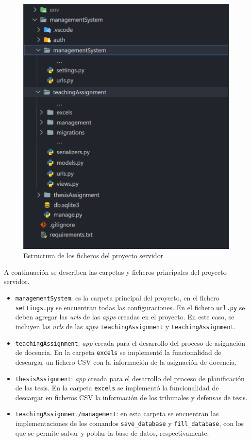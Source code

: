 \begin{figure}[H]
    \centering
    \includegraphics[scale=0.18]{Graphics/Extensibility/server-structure.png}
    \caption{Estructura de los ficheros del proyecto servidor}
    \label{img-server-structure}
\end{figure}

A continuación se describen las carpetas y ficheros principales del proyecto 
servidor.

\begin{itemize}
    \item \texttt{managementSystem}: es la carpeta principal del proyecto, en el fichero \texttt{settings.py} se encuentran
    todas las configuraciones. En el fichero \texttt{url.py} se deben agregar las \textit{urls} de las \textit{apps} creadas 
    en el proyecto. En este caso, se incluyen las \textit{urls} de las \textit{apps} \texttt{teachingAssignment} y \texttt{teachingAssignment}. 
    \item \texttt{teachingAssignment}:  \textit{app} creada para el desarrollo del proceso de asignación de docencia. En la carpeta \texttt{excels}  
    se implementó la funcionalidad de descargar un fichero CSV con la información de la asignación de docencia. 
    \item \texttt{thesisAssignment}:  \textit{app} creada para el desarrollo del proceso de planificación de las tesis. En la carpeta \texttt{excels} 
    se implementó la funcionalidad de descargar en ficheros CSV la información de los tribunales y defensas de tesis.
    \item \texttt{teachingAssignment/management}: en esta carpeta se encuentran las implementaciones de los comandos \texttt{save\_database} 
    y \texttt{fill\_database}, con los que se permite salvar y poblar la base de datos, respectivamente.
\end{itemize}


